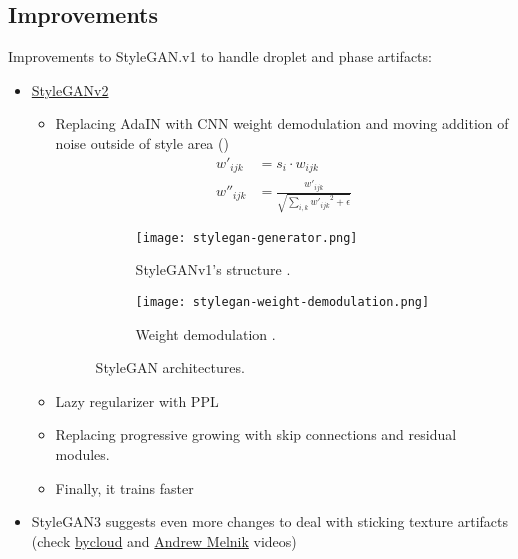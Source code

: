 \subsection{Improvements}
Improvements to StyleGAN.v1 to handle droplet and phase artifacts:
\begin{itemize}
	\item \href{https://youtu.be/c-NJtV9Jvp0}{StyleGANv2} \cite{karras2020analyzing}
	\begin{itemize}
		\item Replacing \ac{AdaIN} with \ac{CNN} weight demodulation and moving addition of noise outside of style area ()
		\begin{align}
			w'_{ijk} &= s_i \cdot w_{ijk}\\
			w''_{ijk} &= \frac{w'_{ijk}}{\sqrt{\sum_{i,k} {w'_{ijk}}^2 + \epsilon}}
		\end{align}
		\begin{figure}[hbt!]
			\centering
			\begin{subfigure}[b]{0.55\textwidth}
				\centering
				\texttt{[image: stylegan-generator.png]}
				\caption{StyleGANv1's structure \cite{karras2019style}.}
				\label{fig:stylegan-generator}
			\end{subfigure}
			\hfill
			\begin{subfigure}[b]{0.4\textwidth}
				\centering
				\texttt{[image: stylegan-weight-demodulation.png]}
				\caption{Weight demodulation \cite{karras2020analyzing}.}
				\label{fig:stylegan-weight-demodulation}
			\end{subfigure}
			\caption{StyleGAN architectures.}
			\label{fig:stylegan}
		\end{figure}
		\item Lazy regularizer with \ac{PPL}
		\item Replacing progressive growing with skip connections and residual modules.
		\item Finally, it trains faster
	\end{itemize}
	\item StyleGAN3 suggests even more changes to deal with sticking texture artifacts (check \href{https://youtu.be/j1ZY7LInN9g}{bycloud} and \href{https://youtu.be/_euFoyLEyqU}{Andrew Melnik} videos) \cite{karras2021alias}
\end{itemize}

